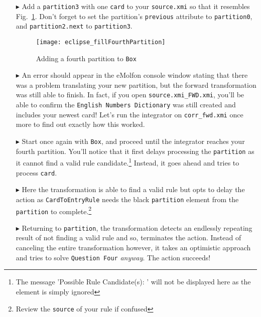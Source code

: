 \begin{itemize}

\item[$\blacktriangleright$] Add a \texttt{partition3} with one \texttt{card} to your \texttt{source.xmi} so that it resembles
Fig.~\ref{fig:fourthPartitionStart}. Don't forget to set the partition's \texttt{previous} attribute to \texttt{partition0}, and \texttt{partition2.next} to
\texttt{partition3}.

\begin{figure}[htbp]
\begin{center}
  \texttt{[image: eclipse\_fillFourthPartition]}
  \caption{Adding a fourth partition to \texttt{Box}}
  \label{fig:fourthPartitionStart}
\end{center}
\end{figure}

\item[$\blacktriangleright$] An error should appear in the eMolfon console window stating that there was a problem translating your new partition, but the
forward transformation was still able to finish. In fact, if you open \texttt{source.xmi\_FWD.xmi}, you'll be able to confirm the \texttt{English Numbers
Dictionary} was still created and includes your newest card! Let's run the integrator on \texttt{corr\_fwd.xmi} once more to find out exactly how this worked.

\item[$\blacktriangleright$] Start once again with \texttt{Box}, and proceed until the integrator reaches your fourth partition. You'll notice that it
first delays processing the \texttt{partition} as it cannot find a valid rule candidate.\footnote{The message 'Possible Rule Candidate(s): ' will not be
displayed here as the element is simply ignored} Instead, it goes ahead and tries to process \texttt{card}.

\item[$\blacktriangleright$] Here the transformation is able to find a valid rule but opts to delay the action as \texttt{CardToEntryRule} needs the black
\texttt{partition} element from the \texttt{partition} to complete.\footnote{Review the \texttt{source} of your rule if confused}

\item[$\blacktriangleright$] Returning to \texttt{partition}, the transformation detects an endlessly repeating result of not finding a valid rule and so,
terminates the action. Instead of canceling the entire transformation however, it takes an optimistic approach and tries to solve \texttt{Question Four}
\emph{anyway}. The action succeeds!


\end{itemize}
